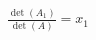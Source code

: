 \documentclass[preview]{standalone}
\begin{document}
\begin{align*}
\frac{\det(A_1)}{\det(A)} = x_1
\end{align*}
\end{document}
